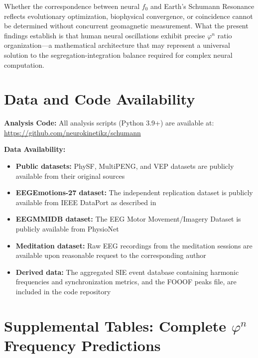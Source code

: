 \documentclass[11pt,a4paper]{article}
\newcommand{\phisym}{\varphi}
\begin{document}
Whether the correspondence between neural $f_0$ and Earth's Schumann Resonance reflects evolutionary optimization, biophysical convergence, or coincidence cannot be determined without concurrent geomagnetic measurement. What the present findings establish is that human neural oscillations exhibit precise $\phisym^n$ ratio organization---a mathematical architecture that may represent a universal solution to the segregation-integration balance required for complex neural computation.

\section*{Data and Code Availability}

\textbf{Analysis Code:} All analysis scripts (Python 3.9+) are available at: \url{https://github.com/neurokinetikz/schumann}

\textbf{Data Availability:}
\begin{itemize}
    \item \textbf{Public datasets:} PhySF, MultiPENG, and VEP datasets are publicly available from their original sources \parencite{albuquerque2024physf, albuquerque2023multimodal, faisal2023eeg}
    \item \textbf{EEGEmotions-27 dataset:} The independent replication dataset is publicly available from IEEE DataPort as described in \textcite{huy2025eeg}
    \item \textbf{EEGMMIDB dataset:} The EEG Motor Movement/Imagery Dataset is publicly available from PhysioNet \parencite{goldberger2000physiobank, schalk2004bci2000}
    \item \textbf{Meditation dataset:} Raw EEG recordings from the meditation sessions are available upon reasonable request to the corresponding author
    \item \textbf{Derived data:} The aggregated SIE event database containing harmonic frequencies and synchronization metrics, and the FOOOF peaks file, are included in the code repository
\end{itemize}

\newpage
\section*{Supplemental Tables: Complete $\phisym^n$ Frequency Predictions}
\end{document}
